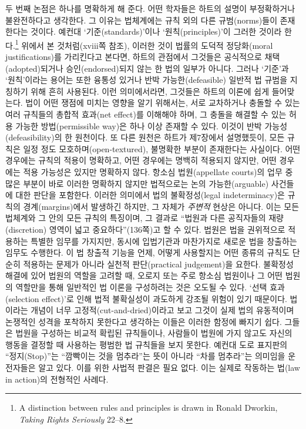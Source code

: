 \documentclass[12pt, oneside]{book}  %
\begin{document}
두 번째 논점은 하나를 명확하게 해 준다. 어떤 학자들은 하트의 설명이
부정확하거나 불완전하다고 생각한다. 그 이유는 법체계에는 규칙 외의 다른
규범(norms)들이 존재한다는 것이다. 예컨대 `기준(standards)'이나
`원칙(principles)'이 그러한 것이라 한다.\footnote{A distinction between
  rules and principles is drawn in Ronald Dworkin, \emph{Taking Rights
  Seriously} 22--8.} 위에서 본 것처럼(xviii쪽 참조), 이러한 것이 법률의
도덕적 정당화(moral justifications)를 가리킨다고 본다면, 하트의 관점에서
그것들은 공식적으로 채택(adopted)되거나 승인(endorsed)되지 않는 한 법의
일부가 아니다. 그러나 `기준'과 `원칙'이라는 용어는 또한 융통성 있거나
반박 가능한(defeasible) 일반적 법 규범을 지칭하기 위해 흔히 사용된다.
이런 의미에서라면, 그것들은 하트의 이론에 쉽게 들어맞는다. 법이 어떤
쟁점에 미치는 영향을 알기 위해서는, 서로 교차하거나 충돌할 수 있는 여러
규칙들의 총합적 효과(net effect)를 이해해야 하며, 그 충돌을 해결할 수
있는 허용 가능한 방법(permissible way)은 하나 이상 존재할 수 있다.
이것이 반박 가능성(defeasibility)의 한 원천이다. 또 다른 원천은 하트가
제7장에서 설명했듯이, 모든 규칙은 일정 정도 모호하며(open-textured),
불명확한 부분이 존재한다는 사실이다. 어떤 경우에는 규칙의 적용이
명확하고, 어떤 경우에는 명백히 적용되지 않지만, 어떤 경우에는 적용
가능성은 있지만 명확하지 않다. 항소심 법원(appellate courts)의 업무 중
많은 부분이 바로 이러한 명확하지 않지만 법적으로는 논의 가능한(arguable)
사건들에 대한 판단을 포함한다. 이러한 의미에서 법의 불확정성(legal
indeterminacy)은 규칙의 경계(margins)에서 발생하긴 하지만, 그 자체가
\emph{주변적} 현상은 아니다. 이는 모든 법체계와 그 안의 모든 규칙의
특징이며, 그 결과로 ``법원과 다른 공직자들의 재량(discretion) 영역이
넓고 중요하다''(136쪽)고 할 수 있다. 법원은 법을 권위적으로 적용하는
특별한 임무를 가지지만, 동시에 입법기관과 마찬가지로 새로운 법을
창출하는 임무도 수행한다. 이 법 창출적 기능을 언제, 어떻게 사용할지는
어떤 종류의 규칙도 단순히 적용하는 문제가 아니라 실천적 판단(practical
judgement)을 요한다. 불확정성 해결에 있어 법원의 역할을 고려할 때,
오로지 또는 주로 항소심 법원이나 그 어떤 법원의 역할만을 통해 일반적인
법 이론을 구성하려는 것은 오도될 수 있다. `선택 효과(selection
effect)'로 인해 법적 불확실성이 과도하게 강조될 위험이 있기 때문이다.
법이라는 개념이 너무 고정적(cut-and-dried)이라고 보고 그것이 실제 법의
유동적이며 논쟁적인 성격을 포착하지 못한다고 생각하는 이들은 이러한
함정에 빠지기 쉽다. 그들은 법원을 구성하는 비교적 확립된 규칙들이나,
사람들이 법원에 가지 않고도 자신의 행동을 결정할 때 사용하는 평범한 법
규칙들을 보지 못한다. 예컨대 도로 표지판의 ``정지(Stop)''는 ``깜빡이는
것을 멈추라''는 뜻이 아니라 ``차를 멈추라''는 의미임을 운전자들은 알고
있다. 이를 위한 사법적 판결은 필요 없다. 이는 실제로 작동하는 법(law in
action)의 전형적인 사례다.
\end{document}
